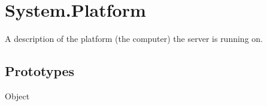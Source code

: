 
\section{System.Platform}
A description of the platform (the computer) the server is running on.

\subsection{Prototypes}
\begin{refObjects}
\item[Object]
\end{refObjects}

